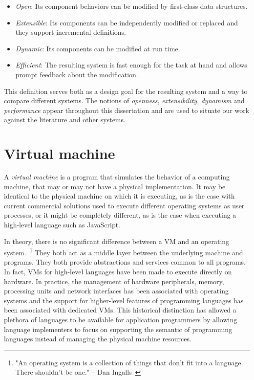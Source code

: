 \begin{itemize}
    \item \textit{Open}: Its component behaviors can be modified by first-class
        data structures. 
    \item \textit{Extensible}: Its components can be independently modified or
        replaced and they support incremental definitions. 
    \item \textit{Dynamic}: Its components can be modified at run time.
    \item \textit{Efficient}: The resulting system is fast enough for the task
        at hand and allows prompt feedback about the modification.
\end{itemize}

This definition serves both as a design goal for the resulting system and a way
to compare different systems. The notions of \textit{openness},
\textit{extensibility}, \textit{dynamism} and \textit{performance} appear
throughout this dissertation and are used to situate our work against the
literature and other systems.

\section{Virtual machine}

A \textit{virtual machine} is a program that simulates the behavior of a
computing machine, that may or may not have a physical implementation. It may
be identical to the physical machine on which it is executing, as is the case
with current commercial solutions used to execute different operating systems
as user processes, or it might be completely different, as is the case when
executing a high-level language such as JavaScript.  

In theory, there is no significant difference between a VM and
an operating system.~\footnote{"An operating system is a collection of
things that don't fit into a language. There shouldn't be one." -- Dan
Ingalls~\cite{Ingalls1981}} They both act as a middle layer between the
underlying machine and programs. They both provide abstractions and
services common to all programs. In fact, VMs for high-level
languages have been made to execute directly on hardware. In practice, the
management of hardware peripherals, memory, processing units and network
interfaces has been associated with operating systems and the support for
higher-level features of programming languages has been associated with
dedicated VMs. This historical distinction has allowed a plethora
of languages to be available for application programmers by allowing language
implementers to focus on supporting the semantic of programming languages
instead of managing the physical machine resources.

